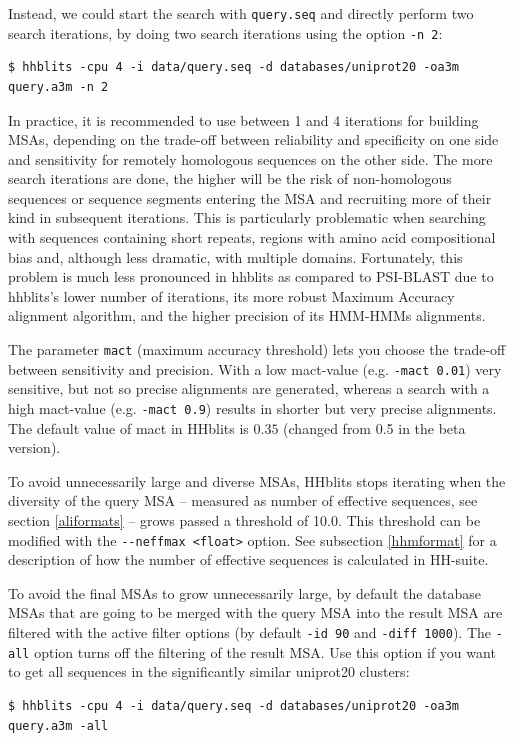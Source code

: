 \documentclass[11pt,a4paper]{article}
\begin{document}
Instead, we could start the search with \verb`query.seq` and directly perform two search iterations, by doing two search iterations using the option \verb`-n 2`:
\begin{verbatim}
$ hhblits -cpu 4 -i data/query.seq -d databases/uniprot20 -oa3m query.a3m -n 2 
\end{verbatim}

In practice, it is recommended to use between 1 and 4 iterations for building MSAs, depending on the trade-off between reliability and specificity on one side and sensitivity for remotely homologous sequences on the other side. The more search iterations are done, the higher will be the risk of non-homologous sequences or sequence segments entering the MSA and recruiting more of their kind in subsequent iterations. This is particularly problematic when searching with sequences containing short repeats, regions with amino acid compositional bias and, although less dramatic,  with multiple domains. Fortunately, this problem is much less pronounced in hhblits as compared to PSI-BLAST due to hhblits's lower number of iterations, its more robust Maximum Accuracy alignment algorithm, and the higher precision of its HMM-HMMs alignments. 

The parameter \verb`mact` (maximum accuracy threshold) lets you choose the trade-off between sensitivity and 
precision. With a low mact-value (e.g. \verb`-mact 0.01`) very sensitive, but not 
so precise alignments are generated, whereas a search with a high mact-value (e.g. \verb`-mact 0.9`) 
results in shorter but very precise alignments. The default value of mact in HHblits is $0.35$ 
(changed from 0.5 in the beta version). 

To avoid unnecessarily large and diverse MSAs, HHblits stops iterating when the diversity of the query MSA -- measured as number of effective sequences, see section \ref{aliformats} -- grows passed a threshold of 10.0. This threshold can be modified with the \verb`--neffmax <float>` option. See subsection \ref{hhmformat} for a description of how the number of effective sequences is calculated in HH-suite.

To avoid the final MSAs to grow unnecessarily large, by default the database MSAs that are going to be merged with the query MSA into the result MSA are filtered with the active filter options (by default \verb`-id 90` and \verb`-diff 1000`). The \verb`-all` option turns off the filtering of the result MSA. Use this option if you want to get all sequences in the significantly similar uniprot20 clusters: 
\begin{verbatim}
$ hhblits -cpu 4 -i data/query.seq -d databases/uniprot20 -oa3m query.a3m -all
\end{verbatim}
\end{document}
